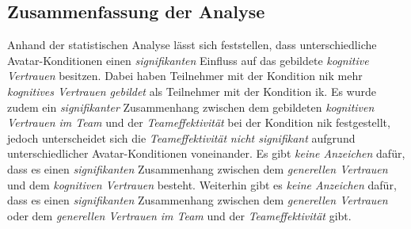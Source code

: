 \documentclass[a4paper,11pt]{article}%
\renewcommand{\\}{\vspace*{0.5\baselineskip} \newline}
\begin{document}
{{\begin{itemize}
\end{itemize}
%
%


\subsection{Zusammenfassung der Analyse}
Anhand der statistischen Analyse lässt sich feststellen, dass unterschiedliche Avatar-Konditionen einen \textit{signifikanten} Einfluss auf das gebildete \textit{kognitive Vertrauen} besitzen. Dabei haben Teilnehmer mit der Kondition \ac{nik} mehr \textit{kognitives Vertrauen gebildet} als Teilnehmer mit der Kondition \ac{ik}. 
Es wurde zudem ein \textit{signifikanter} Zusammenhang zwischen dem gebildeten \textit{kognitiven Vertrauen im Team} und der \textit{Teameffektivität} bei der Kondition \ac{nik} festgestellt, jedoch unterscheidet sich die \textit{Teameffektivität} \textit{nicht signifikant} aufgrund unterschiedlicher Avatar-Konditionen voneinander.
Es gibt \textit{keine Anzeichen} dafür, dass es einen \textit{signifikanten} Zusammenhang zwischen dem \textit{generellen Vertrauen} und dem \textit{kognitiven Vertrauen} besteht. 
Weiterhin gibt es \textit{keine Anzeichen} dafür, dass es einen \textit{signifikanten} Zusammenhang zwischen dem \textit{generellen Vertrauen} oder dem \textit{generellen Vertrauen im Team} und der \textit{Teameffektivität} gibt.

}}
\end{document}
